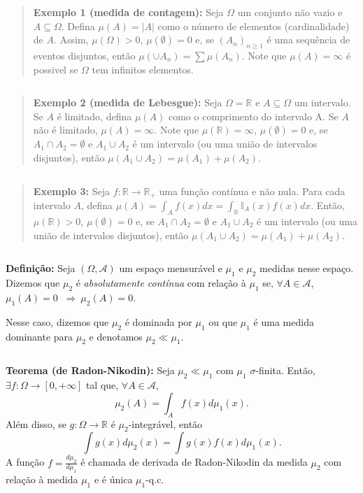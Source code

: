 \documentclass[
]{book}
\begin{document}
\(~\)

\begin{quote}
\textbf{Exemplo 1 (medida de contagem):} Seja \(\Omega\) um conjunto não vazio e \(A\subseteq \Omega\). Defina \(\mu(A)=|A|\) como o número de elementos (cardinalidade) de \(A\). Assim, \(\mu(\Omega) > 0\), \(\mu(\emptyset)=0\) e, se \((A_n)_{n \geq 1}\) é uma sequência de eventos disjuntos, então \(\mu(\cup A_n) = \sum \mu(A_n)\). Note que \(\mu(A)=\infty\) é possivel se \(\Omega\) tem infinitos elementos.
\end{quote}

\(~\)

\begin{quote}
\textbf{Exemplo 2 (medida de Lebesgue):} Seja \(\Omega=\mathbb{R}\) e \(A\subseteq \Omega\) um intervalo. Se \(A\) é limitado, defina \(\mu(A)\) como o comprimento do intervalo A. Se \(A\) não é limitado, \(\mu(A)=\infty\). Note que \(\mu(\mathbb{R})=\infty\), \(\mu(\emptyset)=0\) e, se \(A_1 \cap A_2 = \emptyset\) e \(A_1 \cup A_2\) é um intervalo (ou uma união de intervalos disjuntos), então \(\mu(A_1 \cup A_2) = \mu(A_1) + \mu(A_2)\).
\end{quote}

\(~\)

\begin{quote}
\textbf{Exemplo 3:} Seja \(f: \mathbb{R} \longrightarrow \mathbb{R}_+\) uma função contínua e não nula. Para cada intervalo \(A\), defina \(\displaystyle \mu(A) = \int_A f(x) dx = \int_{\mathbb{R}} \mathbb{I}_A(x) f(x) dx\). Então, \(\mu(\mathbb{R})>0\), \(\mu(\emptyset)=0\) e, se \(A_1 \cap A_2 = \emptyset\) e \(A_1 \cup A_2\) é um intervalo (ou uma união de intervalos disjuntos), então \(\mu(A_1 \cup A_2) = \mu(A_1) + \mu(A_2)\).
\end{quote}

\(~\)

\textbf{Definição:} Seja \((\Omega,\mathcal{A})\) um espaço mensurável e \(\mu_1\) e \(\mu_2\) medidas nesse espaço. Dizemos que \(\mu_2\) é \emph{absolutamente contínua} com relação à \(\mu_1\) se, \(\forall A \in \mathcal{A}\), \(\mu_1(A)=0\) \(~\Rightarrow~ \mu_2(A)=0\).

Nesse caso, dizemos que \(\mu_2\) é dominada por \(\mu_1\) ou que \(\mu_1\) é uma medida dominante para \(\mu_2\) e denotamos \(\mu_2 \ll \mu_1\).

\(~\)

\textbf{Teorema (de Radon-Nikodin):} Seja \(\mu_2 \ll \mu_1\) com \(\mu_1\) \(\sigma\)-finita. Então, \(\exists f: \Omega \longrightarrow [0,+\infty]\) tal que, \(\forall A \in \mathcal{A}\),
\[\mu_2(A) = \int_A f(x) d\mu_1(x).\]
Além disso, se \(g:\Omega \longrightarrow \mathbb{R}\) é \(\mu_2\)-integrável, então
\[\int g(x) d\mu_2(x) = \int g(x) f(x) d\mu_1(x).\]
A função \(f=\frac{d\mu_2}{d\mu_1}\) é chamada de derivada de Radon-Nikodin da medida \(\mu_2\) com relação à medida \(\mu_1\) e é única \(\mu_1\)-q.c.
\end{document}
